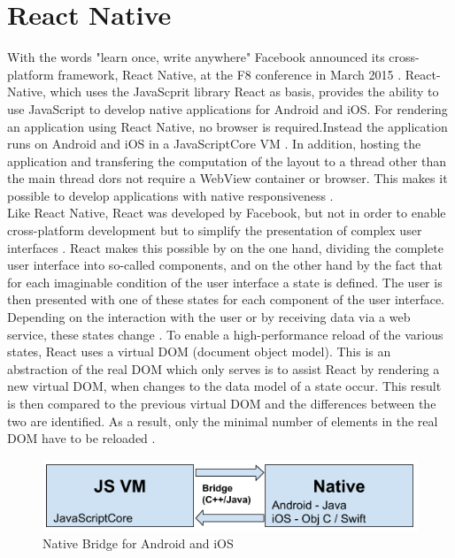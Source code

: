 \documentclass[Bachelor,BIF,english]{twbook}
\begin{document}
\section{React Native}
With the words "learn once, write anywhere" Facebook announced its cross-platform framework, React Native, at the F8 conference in March 2015 \cite[p.~10]{Danielsson_2016} \cite[p.~21]{ZubaBernhard2017EdPb}. React-Native, which uses the JavaScprit library React as basis, provides the ability to use JavaScript to develop native applications for Android and iOS. For rendering an application using React Native, no browser is required.Instead the application runs on Android and iOS in a JavaScriptCore VM \cite[p.~10]{Danielsson_2016} \cite[p.~28]{ZubaBernhard2017EdPb}. In addition, hosting the application and transfering the computation of the layout to a thread other than the main thread dors not require a WebView container or browser. This makes it possible to develop applications with native responsiveness \cite[p.~10-11]{Danielsson_2016}.
\\[\baselineskip]
Like React Native, React was developed by Facebook, but not in order to enable cross-platform development but to simplify the presentation of complex user interfaces \cite[p.~8]{Danielsson_2016}. React makes this possible by on the one hand, dividing the complete user interface into so-called components, and on the other hand by the fact that for each imaginable condition of the user interface a state is defined. The user is then presented with one of these states for each component of the user interface. Depending on the interaction with the user or by receiving data via a web service, these states change \cite[p.~8-9]{Danielsson_2016} \cite[p.~21-27]{ZubaBernhard2017EdPb}. To enable a high-performance reload of the various states, React uses a virtual DOM (document object model). This is an abstraction of the real DOM which only serves is to assist React by rendering a new virtual DOM, when changes to the data model of a state occur. This result is then compared to the previous virtual DOM and the differences between the two are identified. As a result, only the minimal number of elements in the real DOM have to be reloaded \cite[p.~8-9]{Danielsson_2016}.
\begin{figure}[!htbp]
\centering
\includegraphics[width=0.75\linewidth]{PICs/Bachelor1_NativeBridge.png}
\caption{Native Bridge for Android and iOS \cite{PicReactNativeBridge} \cite[p.~28]{ZubaBernhard2017EdPb}}\label{Fig4}
\end{figure}
\end{document}
